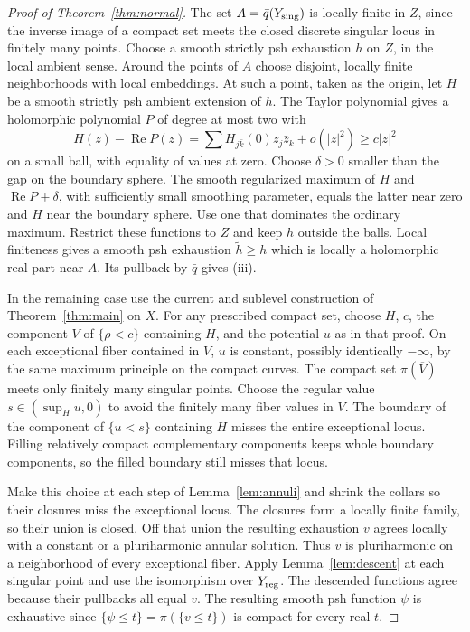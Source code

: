 \documentclass[11pt]{amsart}
\theoremstyle{remark}
\numberwithin{equation}{section}
\begin{document}
\begin{proof}[Proof of Theorem~\ref{thm:normal}]
The set \(A=\bar q(Y_{\rm sing})\) is locally finite in \(Z\), since
the inverse image of a compact set meets the closed discrete singular
locus in finitely many points. Choose a smooth strictly psh exhaustion
\(h\) on \(Z\), in the local ambient sense. Around the points of \(A\)
choose disjoint, locally finite neighborhoods with local embeddings.
At such a point, taken as
the origin, let \(H\) be a smooth strictly psh ambient extension of
\(h\). The Taylor polynomial gives a holomorphic polynomial \(P\)
of degree at most two with
\[
 H(z)-\operatorname{Re}P(z)
     =\sum H_{j\bar k}(0)z_j\bar z_k+o(|z|^2)\geq c|z|^2
\]
on a small ball, with equality of values at zero. Choose \(\delta>0\)
smaller than the gap on the boundary sphere. The smooth regularized
maximum of \(H\) and \(\operatorname{Re}P+\delta\), with sufficiently
small smoothing parameter, equals the latter near zero and \(H\)
near the boundary sphere. Use one that dominates the ordinary maximum.
Restrict these functions to \(Z\) and keep \(h\) outside the balls.
Local finiteness gives a smooth psh exhaustion \(\widetilde h\geq h\)
which is locally a holomorphic real part near \(A\). Its pullback by
\(\bar q\) gives \textup{(iii)}.

In the remaining case use the current and sublevel construction of
Theorem~\ref{thm:main} on \(X\). For any prescribed compact set, choose
\(H\), \(c\), the component \(V\) of \(\{\rho<c\}\) containing \(H\),
and the potential \(u\) as in that proof. On each exceptional fiber
contained in \(V\), \(u\) is constant, possibly identically
\(-\infty\), by the same maximum principle on the compact curves.
The compact set \(\pi(\overline V)\) meets only finitely many singular
points. Choose the regular value \(s\in(\sup_H u,0)\) to avoid the
finitely many fiber values in \(V\). The boundary of the component of
\(\{u<s\}\) containing \(H\) misses the entire exceptional locus.
Filling relatively compact complementary components keeps whole boundary
components, so the filled boundary still misses that locus.

Make this choice at each step of Lemma~\ref{lem:annuli} and shrink
the collars so their closures miss the exceptional locus. The closures
form a locally finite family, so their union is closed. Off that union
the resulting exhaustion \(v\)
agrees locally with a constant or a pluriharmonic annular solution.
Thus \(v\) is pluriharmonic on a neighborhood of every exceptional
fiber. Apply Lemma~\ref{lem:descent} at each singular point and use the
isomorphism over \(Y_{\rm reg}\). The descended functions agree because
their pullbacks all equal \(v\). The resulting smooth psh function
\(\psi\) is exhaustive since
\(\{\psi\leq t\}=\pi(\{v\leq t\})\) is compact for every real \(t\).
\end{proof}
\end{document}
